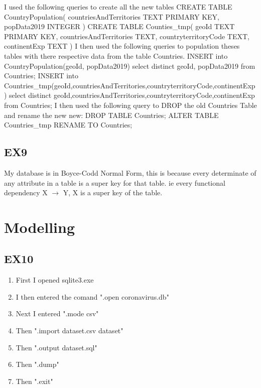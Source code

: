 \documentclass{report}
\begin{document}
	I used the following queries to create all the new tables
	\newline\newline
	CREATE TABLE CountryPopulation(
	countriesAndTerritories TEXT PRIMARY KEY,
	popData2019 INTEGER
	)
	\newline\newline
	CREATE TABLE Counties\_tmp(
	geoId TEXT PRIMARY KEY,
	countriesAndTerritories TEXT,
	countryterritoryCode TEXT,
	continentExp TEXT
	)
	\newline\newline
	I then used the following queries to population theses tables with there respective data from the table Countries.
	\newline
	\newline
	INSERT into CountryPopulation(geoId, popData2019) select distinct geoId, popData2019 from Countries;
	\newline
	\newline
	INSERT into Countries\_tmp(geoId,countriesAndTerritories,countryterritoryCode,continentExp) select distinct geoId,countriesAndTerritories,countryterritoryCode,continentExp from Countries;
	\newline
	\newline
	I then used the following query to DROP the old Countries Table and rename the new new:
	\newline\newline
	DROP TABLE Countries; \newline
	ALTER TABLE Countries\_tmp RENAME TO Countries;
	
	\subsection{EX9}
	
	My database is in Boyce-Codd Normal Form, this is because every determinate of any attribute in a table is a super key for that table. ie every functional dependency X $\rightarrow$ Y, X  is a super key of the table.
	
	\section{Modelling}
	
	\subsection{EX10}	
	
	\begin{enumerate}
		\item First I opened sqlite3.exe
		\item I then entered the comand ".open coronavirus.db"
		\item Next I entered ".mode csv"
		\item Then ".import dataset.csv dataset"
		\item Then ".output dataset.sql"
		\item Then ".dump"
		\item Then ".exit"
	\end{enumerate}
	
\end{document}
